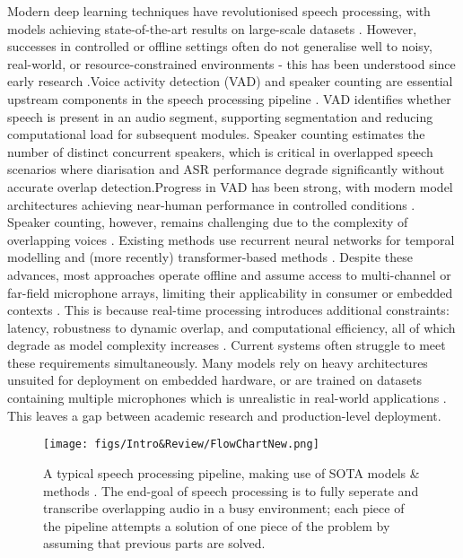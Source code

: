 Modern deep learning techniques have revolutionised speech processing, with models achieving state-of-the-art results on large-scale datasets \cite{transformers}. However, successes in controlled or offline settings often do not generalise well to noisy, real-world, or resource-constrained environments - this has been understood since early research \cite{signal_processing_book}.\newline\newline Voice activity detection (VAD) and speaker counting are essential upstream components in the speech processing pipeline \cite{importance_of_vad}. VAD identifies whether speech is present in an audio segment, supporting segmentation and reducing computational load for subsequent modules. Speaker counting estimates the number of distinct concurrent speakers, which is critical in overlapped speech scenarios \cite{importance_of_OSD} where diarisation and ASR performance degrade significantly without accurate overlap detection.\newline\newline Progress in VAD has been strong, with modern model architectures achieving near-human performance in controlled conditions \cite{vad_review}. Speaker counting, however, remains challenging due to the complexity of overlapping voices \cite{speaker_counting}. Existing methods use recurrent neural networks for temporal modelling \cite{lstm} and (more recently) transformer-based methods \cite{transformers}. Despite these advances, most approaches operate offline and assume access to multi-channel or far-field microphone arrays, limiting their applicability in consumer or embedded contexts \cite{speaker_count_offline}. This is because real-time processing introduces additional constraints: latency, robustness to dynamic overlap, and computational efficiency, all of which degrade as model complexity increases \cite{efficient_ml}. Current systems often struggle to meet these requirements simultaneously. Many models rely on heavy architectures unsuited for deployment on embedded hardware, or are trained on datasets containing multiple microphones which is unrealistic in real-world applications \cite{libricss}. This leaves a gap between academic research and production-level deployment.

\begin{figure}[H]
\label{fig:ideal_pipeline}
\centering
\centerline{\texttt{[image: figs/Intro\&Review/FlowChartNew.png]}}
\caption{A typical speech processing pipeline, making use of SOTA models \& methods \cite{pyannote2020, multidecoder_dprnn,openAIwhisper,cosine_similarity}. The end-goal of speech processing is to fully seperate and transcribe overlapping audio in a busy environment; each piece of the pipeline attempts a solution of one piece of the problem by assuming that previous parts are solved.}
\label{fig:pipeline}
\end{figure}

